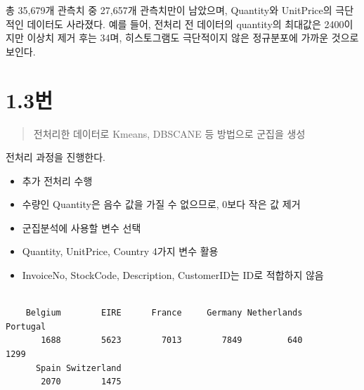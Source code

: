 \documentclass[
  letterpaper,
  DIV=11,
  numbers=noendperiod]{scrreprt}
\newenvironment{Shaded}{\begin{snugshade}}{\end{snugshade}}
\newcommand{\FunctionTok}[1]{\textcolor[rgb]{0.28,0.35,0.67}{#1}}
\newcommand{\NormalTok}[1]{\textcolor[rgb]{0.00,0.23,0.31}{#1}}
\newcommand{\SpecialCharTok}[1]{\textcolor[rgb]{0.37,0.37,0.37}{#1}}
\providecommand{\tightlist}{%
  \setlength{\itemsep}{0pt}\setlength{\parskip}{0pt}}\usepackage{longtable,booktabs,array}
\begin{document}
총 35,679개 관측치 중 27,657개 관측치만이 남았으며, Quantity와
UnitPrice의 극단적인 데이터도 사라졌다. 예를 들어, 전처리 전 데이터의
quantity의 최대값은 2400이지만 이상치 제거 후는 34며, 히스토그램도
극단적이지 않은 정규분포에 가까운 것으로 보인다.

\hypertarget{uxbc88-20}{%
\section*{1.3번}\label{uxbc88-20}}


\begin{quote}
전처리한 데이터로 Kmeans, DBSCANE 등 방법으로 군집을 생성
\end{quote}

전처리 과정을 진행한다.

\begin{itemize}
\tightlist
\item
  추가 전처리 수행
\item
  수량인 Quantity은 음수 값을 가질 수 없으므로, 0보다 작은 값 제거
\item
  군집분석에 사용할 변수 선택
\item
  Quantity, UnitPrice, Country 4가지 변수 활용
\item
  InvoiceNo, StockCode, Description, CustomerID는 ID로 적합하지 않음
\end{itemize}

\begin{Shaded}
\end{Shaded}

\begin{verbatim}

    Belgium        EIRE      France     Germany Netherlands    Portugal 
       1688        5623        7013        7849         640        1299 
      Spain Switzerland 
       2070        1475 
\end{verbatim}
\end{document}
